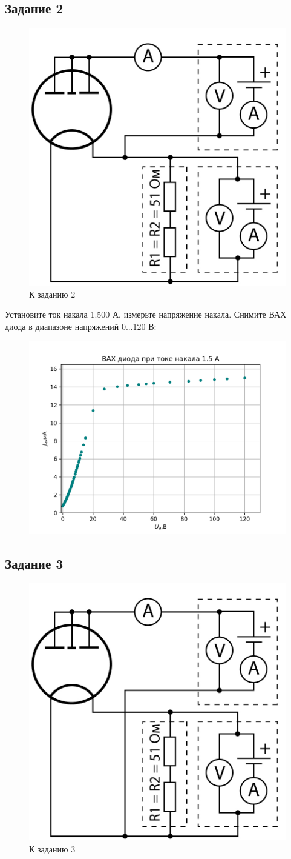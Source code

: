\subsection{Задание 2}

\begin{figure}[H]
	\centering
	\includegraphics[width=0.4\linewidth]{fig/z2.jpg}
	\caption{К заданию 2}
	\label{fig:14}
\end{figure}

Установите ток накала 1.500 А, измерьте напряжение накала. Снимите ВАХ диода в диапазоне напряжений 0...120 В:

\begin{figure}[H]
	\centering
	\includegraphics[width=0.85\linewidth]{scripts/z2.png}
	\caption{}
	\label{fig:15}
\end{figure}

\subsection{Задание 3}

\begin{figure}[h!]
	\centering
	\includegraphics[width=0.4\linewidth]{fig/z3.jpg}
	\caption{К заданию 3}
	\label{fig:16}
\end{figure}

